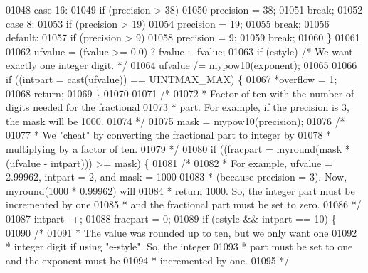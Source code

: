 \begin{DoxyCode}
{{{{{{{{{01048     \textcolor{keywordflow}{case} 16:
01049         \textcolor{keywordflow}{if} (precision > 38)
01050             precision = 38;
01051         \textcolor{keywordflow}{break};
01052     \textcolor{keywordflow}{case} 8:
01053         \textcolor{keywordflow}{if} (precision > 19)
01054             precision = 19;
01055         \textcolor{keywordflow}{break};
01056     \textcolor{keywordflow}{default}:
01057         \textcolor{keywordflow}{if} (precision > 9)
01058             precision = 9;
01059         \textcolor{keywordflow}{break};
01060     \}
01061 
01062     ufvalue = (fvalue >= 0.0) ? fvalue : -fvalue;
01063     \textcolor{keywordflow}{if} (estyle) \textcolor{comment}{/* We want exactly one integer digit. */}
01064         ufvalue /= mypow10(exponent);
01065 
01066     \textcolor{keywordflow}{if} ((intpart = cast(ufvalue)) == UINTMAX\_MAX) \{
01067         *overflow = 1;
01068         \textcolor{keywordflow}{return};
01069     \}
01070 
01071     \textcolor{comment}{/*}
01072 \textcolor{comment}{     * Factor of ten with the number of digits needed for the fractional}
01073 \textcolor{comment}{     * part.  For example, if the precision is 3, the mask will be 1000.}
01074 \textcolor{comment}{     */}
01075     mask = mypow10(precision);
01076     \textcolor{comment}{/*}
01077 \textcolor{comment}{     * We "cheat" by converting the fractional part to integer by}
01078 \textcolor{comment}{     * multiplying by a factor of ten.}
01079 \textcolor{comment}{     */}
01080     \textcolor{keywordflow}{if} ((fracpart = myround(mask * (ufvalue - intpart))) >= mask) \{
01081         \textcolor{comment}{/*}
01082 \textcolor{comment}{         * For example, ufvalue = 2.99962, intpart = 2, and mask = 1000}
01083 \textcolor{comment}{         * (because precision = 3).  Now, myround(1000 * 0.99962) will}
01084 \textcolor{comment}{         * return 1000.  So, the integer part must be incremented by one}
01085 \textcolor{comment}{         * and the fractional part must be set to zero.}
01086 \textcolor{comment}{         */}
01087         intpart++;
01088         fracpart = 0;
01089         \textcolor{keywordflow}{if} (estyle && intpart == 10) \{
01090             \textcolor{comment}{/*}
01091 \textcolor{comment}{             * The value was rounded up to ten, but we only want one}
01092 \textcolor{comment}{             * integer digit if using "e-style".  So, the integer}
01093 \textcolor{comment}{             * part must be set to one and the exponent must be}
01094 \textcolor{comment}{             * incremented by one.}
01095 \textcolor{comment}{             */}
}}}}}}}}}
\end{DoxyCode}
